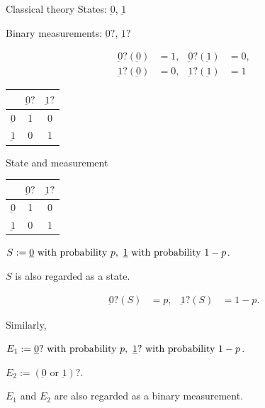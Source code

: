\documentclass{beamer}
\newcommand\emm[1]{\textcolor{redorange}{{#1}}}
\theoremstyle{definition}
\begin{document}
\begin{frame}{Classical theory}
States: $\underbar{0}$, $\underbar{1}$

Binary measurements: $\underbar{0}?$, $\underbar{1}?$

\begin{align*}
\underbar{0}?(\underbar{0}) &= 1,&
\underbar{0}?(\underbar{1}) &= 0,\\
\underbar{1}?(\underbar{0}) &= 0,&
\underbar{1}?(\underbar{1}) &= 1
\end{align*}

\begin{center}
\begin{tabular}{|c||c|c|}
\hline
& $\underbar{0}?$& $\underbar{1}?$\\
\hline
\hline
$\underbar{0}$& 1&0\\
\hline
$\underbar{1}$& 0&1\\
\hline
\end{tabular}
\end{center}
\end{frame}


\begin{frame}{State and measurement}
\begin{center}
\begin{tabular}{|c||c|c|}
\hline
& $\underbar{0}?$& $\underbar{1}?$\\
\hline
\hline
$\underbar{0}$& 1&0\\
\hline
$\underbar{1}$& 0&1\\
\hline
\end{tabular}
\end{center}

$S := \text{$\underbar{0}$ with probability $p$,\, $\underbar{1}$ with probability $1-p$}$.

$S$ is also \emm{regarded as a state}.

\begin{align*}
\underbar{0}?(S) &= p,&
\underbar{1}?(S) &= 1-p.
\end{align*}

Similarly,

$E_1 := \text{$\underbar{0}?$ with probability $p$,\, $\underbar{1}?$ with probability $1-p$}$.

$E_2 := \text{$(\underbar{0}\text{ or }\underbar{1})?$}$.

$E_1$ and $E_2$ are also \emm{regarded as a binary measurement}.

\end{frame}
\end{document}
